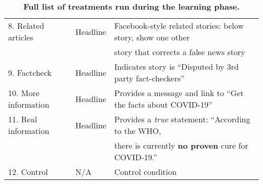 \documentclass[letterpaper, 12pt, parskip=full,DIV=10]{scrartcl}
\begin{document}
\begin{table}[H]
{\begin{tabular}{l|l|l}
\\
8. Related articles                                                                                                       & Headline                                                                                                     & Facebook-style related stories: below story, show one other\\ & &  story that corrects a false news story                                                                                                                                                                                                                                                                                             \\
9. Factcheck                                                                                                      & Headline                                                                                                     & Indicates story is ``Disputed by 3rd party fact-checkers''
 \\
10. More information                                                                                                      & Headline                                                                                                     & Provides a message and link to ``Get the facts about COVID-19''\\
11. Real information                                                                                                      & Headline                                                                                                     & Provides a \textit{true} statement: ``According to the WHO,\\ & & there is currently \textbf{no proven} cure for COVID-19.''
 \\
12. Control                                                                                                        & N/A                                                                                                          & Control condition                                                                                                                                                                                                                                                                                                                                                                                              
\end{tabular}
}
\caption{\textbf{Full list of treatments run during the learning phase.}}
\label{tab:treatments}
\end{table}
\end{document}
